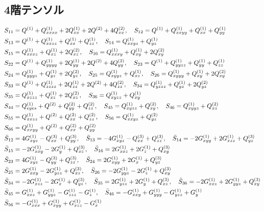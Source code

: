 \documentclass[11pt]{easymemo}
\begin{document}
\subsection{4階テンソル}
\begin{align}
&
S_{11}=Q^{(1)} + Q^{(1)}_{xxxx} + 2Q^{(1)}_{xx} + 2Q^{(2)} + 4Q^{(2)}_{xx},
\quad
S_{12}=Q^{(1)} + Q^{(1)}_{xxyy} + Q^{(1)}_{xx} + Q^{(1)}_{yy}
\cr&
S_{13}=Q^{(1)} + Q^{(1)}_{xxzz} + Q^{(1)}_{xx} + Q^{(1)}_{zz},
\quad
S_{14}=Q^{(1)}_{xxyz} + Q^{(1)}_{yz}
\cr&
S_{15}=Q^{(1)}_{xxxz} + Q^{(1)}_{xz} + 2Q^{(2)}_{xz},
\quad
S_{16}=Q^{(1)}_{xxxy} + Q^{(1)}_{xy} + 2Q^{(2)}_{xy}
\cr&
S_{22}=Q^{(1)} + Q^{(1)}_{yyyy} + 2Q^{(1)}_{yy} + 2Q^{(2)} + 4Q^{(2)}_{yy},
\quad
S_{23}=Q^{(1)} + Q^{(1)}_{yyzz} + Q^{(1)}_{yy} + Q^{(1)}_{zz}
\cr&
S_{24}=Q^{(1)}_{yyyz} + Q^{(1)}_{yz} + 2Q^{(2)}_{yz},
\quad
S_{25}=Q^{(1)}_{xyyz} + Q^{(1)}_{xz},
\quad
S_{26}=Q^{(1)}_{xyyy} + Q^{(1)}_{xy} + 2Q^{(2)}_{xy}
\cr&
S_{33}=Q^{(1)} + Q^{(1)}_{zzzz} + 2Q^{(1)}_{zz} + 2Q^{(2)} + 4Q^{(2)}_{zz},
\quad
S_{34}=Q^{(1)}_{yzzz} + Q^{(1)}_{yz} + 2Q^{(2)}_{yz}
\cr&
S_{35}=Q^{(1)}_{xzzz} + Q^{(1)}_{xz} + 2Q^{(2)}_{xz},
\quad
S_{36}=Q^{(1)}_{xyzz} + Q^{(1)}_{xy}
\cr&
S_{44}=Q^{(1)}_{eyes} + Q^{(2)} + Q^{(2)}_{yy} + Q^{(2)}_{zz},
\quad
S_{45}=Q^{(1)}_{xyzz} + Q^{(2)}_{xy},
\quad
S_{46}=Q^{(1)}_{xyyz} + Q^{(2)}_{xz}
\cr&
S_{55}=Q^{(1)}_{xxzz} + Q^{(2)} + Q^{(2)}_{xx} + Q^{(2)}_{zz},
\quad
S_{56}=Q^{(1)}_{xxyz} + Q^{(2)}_{yz}
\cr&
S_{66}=Q^{(1)}_{xxyy} + Q^{(2)} + Q^{(2)}_{xx} + Q^{(2)}_{yy}
\\&
\bar{S}_{12}=4G^{(1)}_{xyz} - Q^{(3)}_{xx} + Q^{(3)}_{yy},
\quad
\bar{S}_{13}=-4G^{(1)}_{xyz} - Q^{(3)}_{xx} + Q^{(3)}_{zz},
\quad
\bar{S}_{14}=-2G^{(1)}_{xyy} + 2G^{(1)}_{xzz} + Q^{(3)}_{yz}
\cr&
\bar{S}_{15}=-2G^{(1)}_{xxy} - 2G^{(1)}_{y} + Q^{(3)}_{xz},
\quad
\bar{S}_{16}=2G^{(1)}_{xxz} + 2G^{(1)}_{z} + Q^{(3)}_{xy}
\cr&
\bar{S}_{23}=4G^{(1)}_{xyz} - Q^{(3)}_{yy} + Q^{(3)}_{zz},
\quad
\bar{S}_{24}=2G^{(1)}_{xyy} + 2G^{(1)}_{x} + Q^{(3)}_{yz}
\cr&
\bar{S}_{25}=2G^{(1)}_{xxy} - 2G^{(1)}_{yzz} + Q^{(3)}_{xz},
\quad
\bar{S}_{26}=-2G^{(1)}_{yyz} - 2G^{(1)}_{z} + Q^{(3)}_{xy}
\cr&
\bar{S}_{34}=-2G^{(1)}_{xzz} - 2G^{(1)}_{x} + Q^{(3)}_{yz},
\quad
\bar{S}_{35}=2G^{(1)}_{yzz} + 2G^{(1)}_{y} + Q^{(3)}_{xz},
\quad
\bar{S}_{36}=-2G^{(1)}_{xxz} + 2G^{(1)}_{yyz} + Q^{(3)}_{xy}
\cr&
\bar{S}_{45}=G^{(1)}_{xxz} + G^{(1)}_{yyz} - G^{(1)}_{zzz} - G^{(1)}_{z},
\quad
\bar{S}_{46}=-G^{(1)}_{xxy} + G^{(1)}_{yyy} - G^{(1)}_{yzz} + G^{(1)}_{y}
\cr&
\bar{S}_{56}=-G^{(1)}_{xxx} + G^{(1)}_{xyy} + G^{(1)}_{xzz} - G^{(1)}_{x}
\\&

\end{align}
\end{document}
